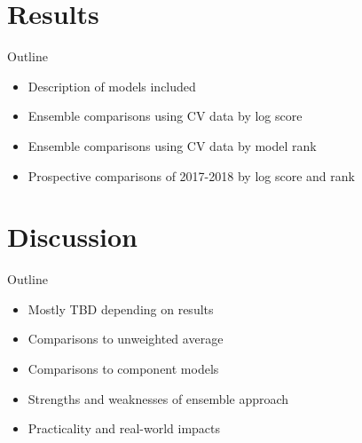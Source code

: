 \documentclass{article}
\begin{document}
\section{Results}

Outline
\begin{itemize}
    \item Description of models included
    \item Ensemble comparisons using CV data by log score
    \item Ensemble comparisons using CV data by model rank
    \item Prospective comparisons of 2017-2018 by log score and rank
\end{itemize}






\section{Discussion}

Outline
\begin{itemize}
  \item Mostly TBD depending on results
  \item Comparisons to unweighted average
  \item Comparisons to component models
  \item Strengths and weaknesses of ensemble approach
  \item Practicality and real-world impacts
\end{itemize}




\end{document}
